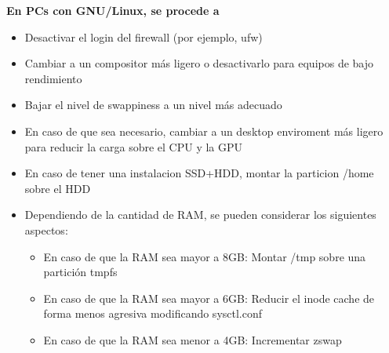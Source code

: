 \documentclass{article}
\begin{document}
			\textbf{En PCs con GNU/Linux, se procede a}
			\begin{itemize}
			\item Desactivar el login del firewall (por ejemplo, ufw)
			\item Cambiar a un compositor más ligero o desactivarlo para equipos de bajo rendimiento
			\item Bajar el nivel de swappiness a un nivel más adecuado
			\item En caso de que sea necesario, cambiar a un desktop enviroment más ligero
			para reducir la carga sobre el CPU y la GPU
			\item En caso de tener una instalacion SSD+HDD, montar la particion /home sobre el HDD
			\item Dependiendo de la cantidad de RAM, se pueden considerar los siguientes aspectos:
				\begin{itemize}
				\item En caso de que la RAM sea mayor a 8GB: Montar /tmp sobre una partición tmpfs
				\item En caso de que la RAM sea mayor a 6GB: Reducir el inode cache de forma menos agresiva modificando sysctl.conf
				\item En caso de que la RAM sea menor a 4GB: Incrementar zswap
				\end{itemize}
			\end{itemize}
		
\end{document}
